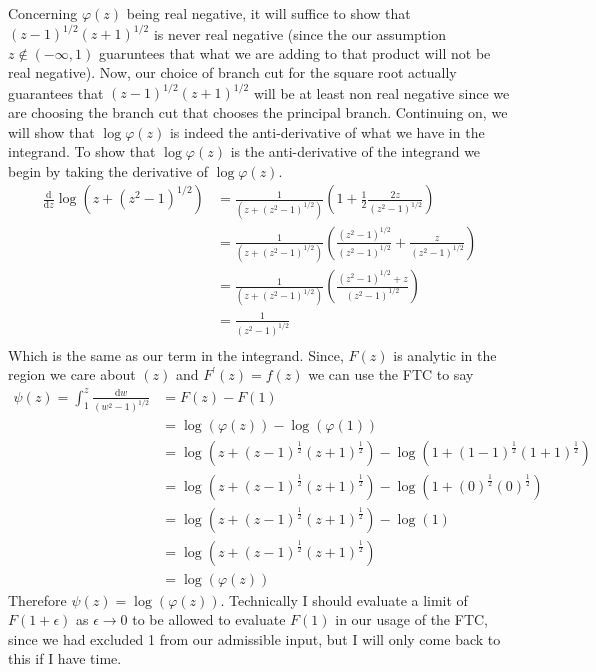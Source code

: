 \documentclass[10pt]{amsart}
\newcommand{\D}{\mathrm{d}}
\theoremstyle{nonumberplain}
\begin{document}
\begin{enumerate}[label={\bf {\arabic*}:}]
\begin{itemize}
   Concerning $\varphi(z)$ being real negative, it will suffice to show that $(z - 1)^{1/2}(z + 1)^{1/2}$ is never real negative (since the our assumption $z \not \in (-\infty, 1)$ guaruntees that what we are adding to that product will not be real negative).
   Now, our choice of branch cut for the square root actually guarantees that $(z - 1)^{1/2}(z + 1)^{1/2}$ will be at least non real negative since we are choosing the branch cut that chooses the principal branch.
   Continuing on, we will show that $\log \varphi(z)$ is indeed the anti-derivative of what we have in the integrand.
   To show that $\log \varphi(z)$ is the anti-derivative of the integrand we begin by taking the derivative of $\log \varphi(z)$.
   \begin{align*}
   \frac{\D}{\D z} \log (z + (z^2 - 1)^{1/2}) &= \frac{1}{(z + (z^2 - 1)^{1/2})}\left( 1 + \frac{1}{2}\frac{2z}{(z^2 - 1)^{1/2}} \right) \\
							     &= \frac{1}{(z + (z^2 - 1)^{1/2})}\left( \frac{(z^2 - 1)^{1/2}}{(z^2 - 1)^{1/2}} + \frac{z}{(z^2 - 1)^{1/2}} \right) \\
							     &= \frac{1}{(z + (z^2 - 1)^{1/2})}\left( \frac{(z^2 - 1)^{1/2} + z}{(z^2 - 1)^{1/2}} \right) \\
							     &= \frac{1}{(z^2 - 1)^{1/2}} \\
   \end{align*}
   Which is the same as our term in the integrand.
   Since, $F(z)$ is analytic in the region we care about $(z)$ and $F^\prime(z) = f(z)$ we can use the FTC to say
   \begin{align*}
   \psi(z) = \int_1^z \frac{\D w}{(w^2 - 1)^{1/2}} &= F(z) - F(1) \\
							&= \log(\varphi(z)) - \log(\varphi(1)) \\
							&= \log(z + (z - 1)^{\frac{1}{2}}(z + 1)^{\frac{1}{2}}) - \log(1 + (1 - 1)^{\frac{1}{2}}(1 + 1)^{\frac{1}{2}}) \\
							&= \log(z + (z - 1)^{\frac{1}{2}}(z + 1)^{\frac{1}{2}}) - \log(1 + (0)^{\frac{1}{2}}(0)^{\frac{1}{2}}) \\
							&= \log(z + (z - 1)^{\frac{1}{2}}(z + 1)^{\frac{1}{2}}) - \log(1) \\
							&= \log(z + (z - 1)^{\frac{1}{2}}(z + 1)^{\frac{1}{2}}) \\
							&= \log(\varphi(z))
   \end{align*}
   Therefore $\psi(z) = \log(\varphi(z))$.
   Technically I should evaluate a limit of $F(1 + \epsilon)$ as $\epsilon \rightarrow 0$ to be allowed to evaluate $F(1)$ in our usage of the FTC, since we had excluded 1 from our admissible input, but I will only come back to this if I have time.

\end{itemize}
\end{enumerate}
\end{document}
